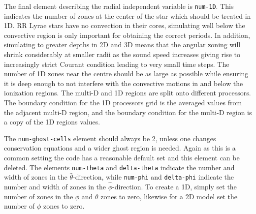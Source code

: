 \documentclass[12pt,a4paper]{book}
\begin{document}
The final element describing the radial independent variable is {\tt num-1D}. This indicates the number of zones at the center of the star which should be treated in 1D. RR Lyrae stars have no convection in their cores, simulating well below the convective region is only important for obtaining the correct periods. In addition, simulating to greater depths in 2D and 3D means that the angular zoning will shrink considerably at smaller radii as the sound speed increases giving rise to increasingly strict Courant condition leading to very small time steps. The number of 1D zones near the centre should be as large as possible while ensuring it is deep enough to not interfere with the convective motions in and below the ionization regions. The multi-D and 1D regions are split onto different processors. The boundary condition for the 1D processors grid is the averaged values from the adjacent multi-D region, and the boundary condition for the multi-D region is a copy of the 1D regions values. 

The {\tt num-ghost-cells} element should always be 2, unless one changes conservation equations and a wider ghost region is needed. Again as this is a common setting the code has a reasonable default set and this element can be deleted. The elements {\tt num-theta} and {\tt delta-theta} indicate the number and width of zones in the $\hat{\theta}$-direction, while {\tt num-phi} and {\tt delta-phi} indicate the number and width of zones in the $\hat{\phi}$-direction. To create a 1D, simply set the number of zones in the ${\phi}$ and ${\theta}$ zones to zero, likewise for a 2D model set the number of ${\phi}$ zones to zero.
\end{document}

